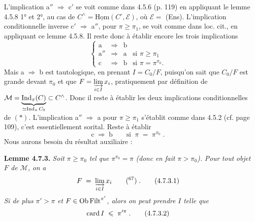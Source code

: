 L’implication a$''$ $\Longrightarrow$ c$'$ se voit comme dans 4.5.6 (p. 119) en appliquant le lemme 4.5.8 1° et 2°, au cas de $C^{\wedge} = \underline{\mathrm{Hom}}(C^{\circ}, \mathcal{E})$, où $\mathcal{E} =$ (Ens). L’implication conditionnelle inverse c$'$ $\Longrightarrow$ a$''$, pour $\pi \geqslant \pi_1$, se voit comme dans loc. cit., en appliquant ce lemme 4.5.8. Il reste donc à établir encore les trois implications
\[
\left\{
\begin{array}{ccll}
\text{a} & \Longrightarrow & \text{b} & \\[4pt]
\text{a}'' & \Longrightarrow & \text{a} & \text{si } \pi \geqslant \pi_1 \\[4pt]
\text{c} & \Longrightarrow & \text{b} & \text{si } \pi = \pi^{\pi_0}.
\end{array}
\right. \tag*{$(*)$}
\]
Mais a $\Longrightarrow$ b est tautologique, en prenant $I = C_0/F$, puisqu’on sait que $C_0/F$ est grande devant $\pi_0$ et que $F = \varinjlim\limits_{i \in I} x_i$, pratiquement par définition de $\mathcal{M} = \underbrace{\operatorname{Ind}_{\pi}(C)}_{\simeq \operatorname{Ind}_{\pi} C_0} \subset C^{\wedge}$. Donc il reste à établir les deux implications conditionnelles de $(*)$. L’implication a$''$ $\Longrightarrow$ a pour $\pi \geqslant \pi_1$ s’établit comme dans 4.5.2 (cf. page 109), c’est essentiellement sorital. Reste à établir
\[
\text{c} \;\Longrightarrow\; \text{b} \qquad \text{si} \;\; \pi \;=\; \pi^{\pi_0} \;. \tag*{$(*)$}
\]
Nous aurons besoin du résultat auxiliaire :

\textbf{Lemme 4.7.3.} \textit{Soit $\pi \geqslant \pi_0$ tel que $\pi^{\pi_0} = \pi$ (donc en fait $\pi > \pi_0$). Pour tout objet $F$ de $\mathcal{M}$, on a}
\[
F \;=\; \varinjlim_{i \in I} x_i \qquad \text{(\footnotemark[67])}\;. \tag*{(4.7.3.1)}
\]
\textit{Si de plus $\pi' > \pi$ et $F \in \operatorname{Ob} \operatorname{Filt}^{\pi'}$, alors on peut prendre $I$ telle que}
\[
\operatorname{card} I \;\leqslant\; \pi'^{\pi} \;. \tag*{(4.7.3.2)}
\]

